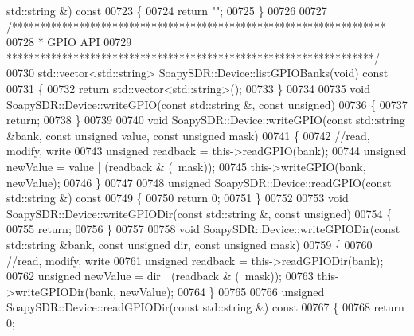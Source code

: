 \begin{DoxyCode}
      std::string &)\textcolor{keyword}{ const}
00723 \textcolor{keyword}{}\{
00724     \textcolor{keywordflow}{return} \textcolor{stringliteral}{""};
00725 \}
00726 
00727 \textcolor{comment}{/*******************************************************************}
00728 \textcolor{comment}{ * GPIO API}
00729 \textcolor{comment}{ ******************************************************************/}
00730 std::vector<std::string> SoapySDR::Device::listGPIOBanks(\textcolor{keywordtype}{void})\textcolor{keyword}{ const}
00731 \textcolor{keyword}{}\{
00732     \textcolor{keywordflow}{return} std::vector<std::string>();
00733 \}
00734 
00735 \textcolor{keywordtype}{void} SoapySDR::Device::writeGPIO(\textcolor{keyword}{const} std::string &, \textcolor{keyword}{const} \textcolor{keywordtype}{unsigned})
00736 \{
00737     \textcolor{keywordflow}{return};
00738 \}
00739 
00740 \textcolor{keywordtype}{void} SoapySDR::Device::writeGPIO(\textcolor{keyword}{const} std::string &bank, \textcolor{keyword}{const} \textcolor{keywordtype}{unsigned} value, \textcolor{keyword}{const} \textcolor{keywordtype}{unsigned} 
      mask)
00741 \{
00742     \textcolor{comment}{//read, modify, write}
00743     \textcolor{keywordtype}{unsigned} readback = this->readGPIO(bank);
00744     \textcolor{keywordtype}{unsigned} newValue = value | (readback & (~mask));
00745     this->writeGPIO(bank, newValue);
00746 \}
00747 
00748 \textcolor{keywordtype}{unsigned} SoapySDR::Device::readGPIO(\textcolor{keyword}{const} std::string &)\textcolor{keyword}{ const}
00749 \textcolor{keyword}{}\{
00750     \textcolor{keywordflow}{return} 0;
00751 \}
00752 
00753 \textcolor{keywordtype}{void} SoapySDR::Device::writeGPIODir(\textcolor{keyword}{const} std::string &, \textcolor{keyword}{const} \textcolor{keywordtype}{unsigned})
00754 \{
00755     \textcolor{keywordflow}{return};
00756 \}
00757 
00758 \textcolor{keywordtype}{void} SoapySDR::Device::writeGPIODir(\textcolor{keyword}{const} std::string &bank, \textcolor{keyword}{const} \textcolor{keywordtype}{unsigned} dir, \textcolor{keyword}{const} \textcolor{keywordtype}{unsigned} 
      mask)
00759 \{
00760     \textcolor{comment}{//read, modify, write}
00761     \textcolor{keywordtype}{unsigned} readback = this->readGPIODir(bank);
00762     \textcolor{keywordtype}{unsigned} newValue = dir | (readback & (~mask));
00763     this->writeGPIODir(bank, newValue);
00764 \}
00765 
00766 \textcolor{keywordtype}{unsigned} SoapySDR::Device::readGPIODir(\textcolor{keyword}{const} std::string &)\textcolor{keyword}{ const}
00767 \textcolor{keyword}{}\{
00768     \textcolor{keywordflow}{return} 0;

\end{DoxyCode}
